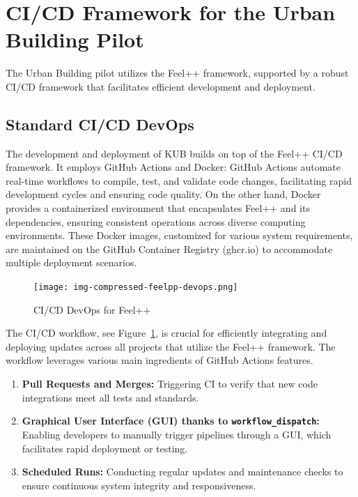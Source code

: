 \documentclass[runningheads]{llncs}
\begin{document}


\section{CI/CD Framework for the Urban Building Pilot}
\label{sec:cicd-framework}

The Urban Building pilot utilizes the Feel++ framework, supported by a robust CI/CD framework that facilitates efficient development and deployment. %

\subsection{Standard CI/CD DevOps}
The development and deployment of KUB builds on top of the Feel++ CI/CD framework. It employs GitHub Actions and Docker: GitHub Actions automate real-time workflows to compile, test, and validate code changes, facilitating rapid development cycles and ensuring code quality. On the other hand, Docker provides a containerized environment that encapsulates Feel++ and its dependencies, ensuring consistent operations across diverse computing environments. These Docker images, customized for various system requirements, are maintained on the GitHub Container Registry (ghcr.io) to accommodate multiple deployment scenarios.

\begin{figure}
    \centering
    \texttt{[image: img-compressed-feelpp-devops.png]}
    \caption{CI/CD DevOps for Feel++}
    \label{fig:feelpp-devops}
\end{figure}
The CI/CD workflow, see Figure~\ref{fig:feelpp-devops}, is crucial for efficiently integrating and deploying updates across all projects that utilize the Feel++ framework. The workflow leverages various main ingredients of GitHub Actions features.
\begin{enumerate}
    \item \textbf{Pull Requests and Merges:} Triggering CI to verify that new code integrations meet all tests and standards.
    \item \textbf{Graphical User Interface (GUI) thanks to \texttt{workflow\_dispatch}:} Enabling developers to manually trigger pipelines through a GUI, which facilitates rapid deployment or testing. 
    \item \textbf{Scheduled Runs:} Conducting regular updates and maintenance checks to ensure continuous system integrity and responsiveness.
\end{enumerate}
\end{document}

